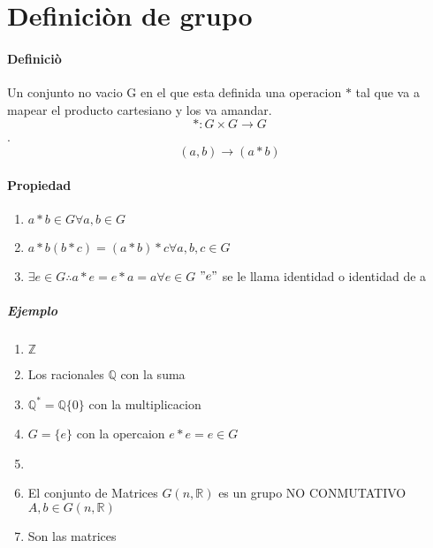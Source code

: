 \section{Definici\`{o}n de grupo}
\paragraph{Definici\`{o}}
Un conjunto no vacio G en el que esta definida una operacion $*$ tal que va a mapear el producto cartesiano y los va amandar.\[ *:G\times G\rightarrow G  \].
\[ (a,b)\rightarrow (a*b) \]
\paragraph{Propiedad}
\begin{enumerate}
  \item $a*b \in G \forall a,b \in G$
  \item $a*b(b*c)=(a*b)*c \forall a,b,c \in G$
  \item $\exists  e \in G \therefore a*e=e*a=a\forall e\in G$ $"e"$ se le llama identidad o identidad de a
  \end{enumerate}
  \subparagraph{Ejemplo}
  \begin{enumerate}
    \item $\mathbb{Z}$ 
    \item Los racionales $ \mathbb{Q} $ con la suma
    \item $\mathbb{Q} ^{*} =  \mathbb{Q} \{0\} $ con la multiplicacion
    \item $G=\{e\} $ con la opercaion $e*e=e\in G$
    \item
    \item El conjunto de Matrices $G(n,\mathbb{R})$ es un grupo NO CONMUTATIVO 
    $A,b\in G(n,\mathbb{R} )$
    \item Son las matrices  
  \end{enumerate}

